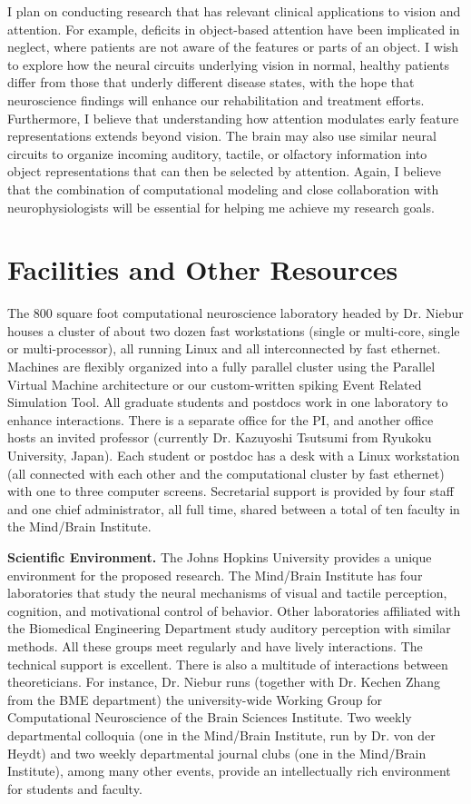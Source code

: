 \documentclass[11pt,notitlepage]{article}
\begin{document}
I plan on conducting research that has relevant clinical applications to vision and attention. For example, deficits in object-based attention have been implicated in neglect, where patients are not aware of the features or parts of an object. I wish to explore how the neural circuits underlying vision in normal, healthy patients differ from those that underly different disease states, with the hope that neuroscience findings will enhance our rehabilitation and treatment efforts. Furthermore, I believe that understanding how attention modulates early feature representations extends beyond vision. The brain may also use similar neural circuits to organize incoming auditory, tactile, or olfactory information into object representations that can then be selected by attention. Again, I believe that the combination of computational modeling and close collaboration with neurophysiologists will be essential for helping me achieve my research goals.

\clearpage

\section*{Facilities and Other Resources}

The 800 square foot computational neuroscience laboratory headed by Dr. Niebur houses a cluster of about two dozen fast workstations (single or multi-core, single or multi-processor), all running Linux and all interconnected by fast ethernet. Machines are flexibly organized into a fully parallel cluster using the Parallel Virtual Machine architecture or our custom-written spiking Event Related Simulation Tool. All graduate students and postdocs work in one laboratory to enhance interactions. There is a separate office for the PI, and another office hosts an invited professor (currently Dr. Kazuyoshi Tsutsumi from Ryukoku University, Japan). Each student or postdoc has a desk with a Linux workstation (all connected with each other and the computational cluster by fast ethernet) with one to three computer screens. Secretarial support is provided by four staff and one chief administrator, all full time, shared between a total of ten faculty in the Mind/Brain Institute.

\textbf{Scientific Environment.} The Johns Hopkins University provides a unique environment for the proposed research. The Mind/Brain Institute has four laboratories that study the neural mechanisms of visual and tactile perception, cognition, and motivational control of behavior. Other laboratories affiliated with the Biomedical Engineering Department study auditory perception with similar methods. All these groups meet regularly and have lively interactions. The technical support is excellent. There is also a multitude of interactions between theoreticians. For instance, Dr. Niebur runs (together with Dr. Kechen Zhang from the BME department) the university-wide Working Group for Computational Neuroscience of the Brain Sciences Institute. Two weekly departmental colloquia (one in the Mind/Brain Institute, run by Dr. von der Heydt) and two weekly departmental journal clubs (one in the Mind/Brain Institute), among many other events, provide an intellectually rich environment for students and faculty.
\end{document}
